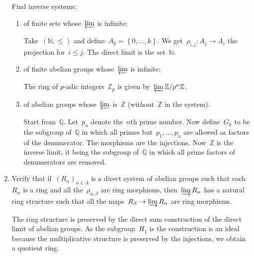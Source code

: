\documentclass[a4paper,11pt,oneside,openany,article]{memoir}
\begin{document}
\begin{enumerate}
    Find inverse systems:
    \begin{enumerate}
      \item of finite sets whose~$\varprojlim$ is infinite;

        \begin{solution}
          Take~$(\mathbb{N},\leq)$ and define~$A_k=\left\{ 0,\ldots,k \right\}$. We get~$\rho_{i,j}\colon A_j\to A_i$ the projection for~$i\leq j$. The direct limit is the set~$\mathbb{N}$.
        \end{solution}

      \item of finite abelian groups whose~$\varprojlim$ is infinite;

        \begin{solution}
          The ring of $p$\nobreakdash-adic integers~$\mathbb{Z}_p$ is given by~$\varprojlim\mathbb{Z}/p^n\mathbb{Z}$.
        \end{solution}

      \item of abelian groups whose~$\varprojlim$ is~$\mathbb{Z}$ (without~$\mathbb{Z}$ in the system).

        \begin{solution}
          Start from~$\mathbb{Q}$. Let~$p_n$ denote the~$n$th prime number. Now define~$G_k$ to be the subgroup of~$\mathbb{Q}$ in which all primes but~$p_1,\ldots,p_n$ are allowed as factors of the denumerator. The morphisms are the injections. Now~$\mathbb{Z}$ is the inverse limit, it being the subgroup of~$\mathbb{Q}$ in which all prime factors of denumerators are removed.
        \end{solution}
    \end{enumerate}

  \item Verify that if~$(R_\alpha)_{\alpha\in\Lambda}$ is a direct system of abelian groups such that each~$R_\alpha$ is a ring and all the~$\rho_{\alpha,\beta}$ are ring morphisms, then~$\varinjlim R_\alpha$ has a natural ring structure such that all the maps~$R_\beta\to\varinjlim R_\alpha$ are ring morphisms.

    \begin{solution}
      The ring structure is preserved by the direct sum construction of the direct limit of abelian groups. As the subgroup~$H_1$ is the construction is an ideal because the multiplicative structure is preserved by the injections, we obtain a quotient ring.
    \end{solution}


\end{enumerate}
\end{document}
